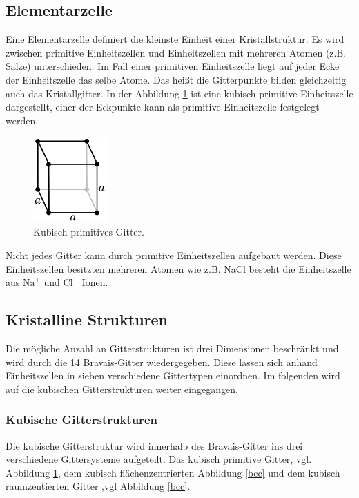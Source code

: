 \subsection{Elementarzelle}
Eine Elementarzelle definiert die kleinste Einheit einer Kristallstruktur.
Es wird zwischen primitive Einheitszellen und Einheitszellen mit mehreren Atomen
(z.B. Salze) unterschieden. Im Fall einer primitiven Einheitszelle
liegt auf jeder Ecke der Einheitszelle das selbe Atome. Das heißt die Gitterpunkte
bilden gleichzeitig auch das Kristallgitter. In der Abbildung \ref{primitiv} ist
eine kubisch primitive Einheitszelle dargestellt, einer der Eckpunkte kann
als primitive Einheitszelle festgelegt werden.

\begin{figure}
    \centering
    \includegraphics[width=0.25\textwidth]{ressources/primitiv.png}
    \caption{Kubisch primitives Gitter\cite{skript}.}
    \label{primitiv}
\end{figure}
Nicht jedes Gitter kann durch primitive Einheitszellen aufgebaut werden.
Diese Einheitszellen besitzten mehreren Atomen
wie z.B. NaCl besteht die Einheitszelle aus $\text{Na}^+$
und $\text{Cl}^-$ Ionen.
\subsection{Kristalline Strukturen}
Die mögliche Anzahl an Gitterstrukturen ist drei Dimensionen beschränkt und
wird durch die 14 Bravais-Gitter wiedergegeben. Diese lassen sich anhand
Einheitszellen in sieben verschiedene Gittertypen einordnen. Im folgenden
wird auf die kubischen Gitterstrukturen weiter eingegangen.
\subsubsection{Kubische Gitterstrukturen}
Die kubische Gitterstruktur wird innerhalb des Bravais-Gitter ins drei
verschiedene Gittersysteme aufgeteilt. Das kubisch primitive Gitter, vgl.
Abbildung \ref{primitiv}, dem kubisch flächenzentrierten Abbildung \ref{bcc} und dem
kubisch raumzentierten Gitter ,vgl Abbildung \ref{bcc}.

